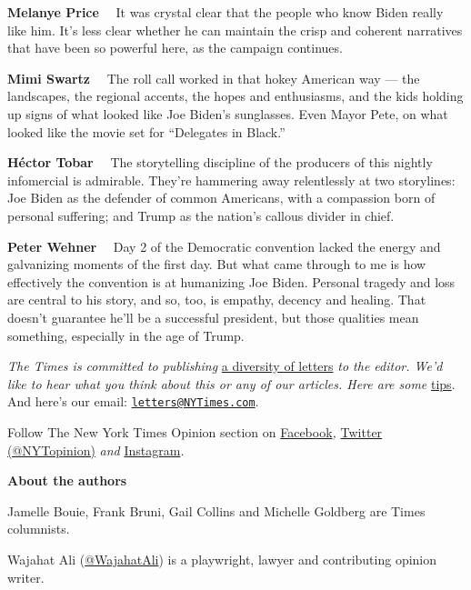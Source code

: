 \textbf{Melanye Price}~~ It was crystal clear that the people who know
Biden really like him. It's less clear whether he can maintain the crisp
and coherent narratives that have been so powerful here, as the campaign
continues.

\textbf{Mimi Swartz}~~ The roll call worked in that hokey American way
--- the landscapes, the regional accents, the hopes and enthusiasms, and
the kids holding up signs of what looked like Joe Biden's sunglasses.
Even Mayor Pete, on what looked like the movie set for ``Delegates in
Black.''

\textbf{Héctor Tobar}~~ The storytelling discipline of the producers of
this nightly infomercial is admirable. They're hammering away
relentlessly at two storylines: Joe Biden as the defender of common
Americans, with a compassion born of personal suffering; and Trump as
the nation's callous divider in chief.

\textbf{Peter Wehner}~~ Day 2 of the Democratic convention lacked the
energy and galvanizing moments of the first day. But what came through
to me is how effectively the convention is at humanizing Joe Biden.
Personal tragedy and loss are central to his story, and so, too, is
empathy, decency and healing. That doesn't guarantee he'll be a
successful president, but those qualities mean something, especially in
the age of Trump.

\emph{The Times is committed to publishing}
\href{https://www.nytimes3xbfgragh.onion/2019/01/31/opinion/letters/letters-to-editor-new-york-times-women.html}{a
diversity of letters} \emph{to the editor. We'd like to hear what you
think about this or any of our articles. Here are some}
\href{https://help.nytimes3xbfgragh.onion/hc/en-us/articles/115014925288-How-to-submit-a-letter-to-the-editor}{tips}.
And here's our email:
\href{mailto:letters@NYTimes.com}{\nolinkurl{letters@NYTimes.com}}.

Follow The New York Times Opinion section on
\href{https://www.facebookcorewwwi.onion/nytopinion}{Facebook}\emph{,}
\href{http://twitter.com/NYTOpinion}{Twitter (@NYTopinion)} \emph{and}
\href{https://www.instagram.com/nytopinion/}{Instagram}\emph{.}

\textbf{About the authors}

Jamelle Bouie, Frank Bruni, Gail Collins and Michelle Goldberg are Times
columnists.

Wajahat Ali
(\href{https://twitter.com/WajahatAli?ref_src=twsrc\%5Egoogle\%7Ctwcamp\%5Eserp\%7Ctwgr\%5Eauthor}{@WajahatAli})
is a playwright, lawyer and contributing opinion writer.

